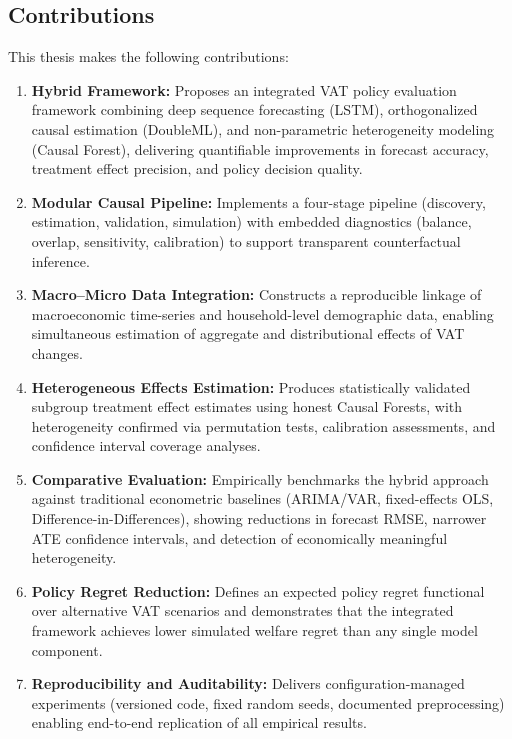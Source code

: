 \subsection{Contributions}\label{subsec:contributions}

This thesis makes the following contributions:

\begin{enumerate}
  \item \textbf{Hybrid Framework:} Proposes an integrated VAT policy evaluation framework combining deep sequence forecasting (LSTM), orthogonalized causal estimation (DoubleML), and non-parametric heterogeneity modeling (Causal Forest), delivering quantifiable improvements in forecast accuracy, treatment effect precision, and policy decision quality.
  \item \textbf{Modular Causal Pipeline:} Implements a four-stage pipeline (discovery, estimation, validation, simulation) with embedded diagnostics (balance, overlap, sensitivity, calibration) to support transparent counterfactual inference.
  \item \textbf{Macro--Micro Data Integration:} Constructs a reproducible linkage of macroeconomic time-series and household-level demographic data, enabling simultaneous estimation of aggregate and distributional effects of VAT changes.
  \item \textbf{Heterogeneous Effects Estimation:} Produces statistically validated subgroup treatment effect estimates using honest Causal Forests, with heterogeneity confirmed via permutation tests, calibration assessments, and confidence interval coverage analyses.
  \item \textbf{Comparative Evaluation:} Empirically benchmarks the hybrid approach against traditional econometric baselines (ARIMA/VAR, fixed-effects OLS, Difference-in-Differences), showing reductions in forecast RMSE, narrower ATE confidence intervals, and detection of economically meaningful heterogeneity.
  \item \textbf{Policy Regret Reduction:} Defines an expected policy regret functional over alternative VAT scenarios and demonstrates that the integrated framework achieves lower simulated welfare regret than any single model component.
  \item \textbf{Reproducibility and Auditability:} Delivers configuration-managed experiments (versioned code, fixed random seeds, documented preprocessing) enabling end-to-end replication of all empirical results.

\end{enumerate}

